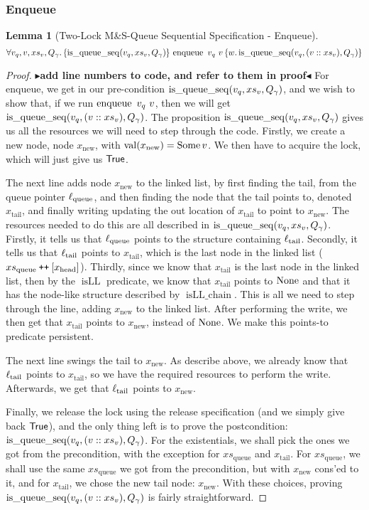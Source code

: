 \documentclass[a4paper, 10pt]{report}
\theoremstyle{definition}
\newtheorem{lemma}[theorem]{Lemma}
\newcommand{\enqueue}{\operatorname{enqueue}}
\newcommand{\msq}{M\&S-Queue\xspace}
\newcommand{\tlmsq}{Two-Lock \msq}
\newcommand{\isqueueseq}{\operatorname{is\_queue\_seq}}
\newcommand{\vq}{v_q}
\newcommand{\xsqueue}{xs_{\mathrm{queue}}}
\newcommand{\isLLchain}{\operatorname{isLL\_chain}}
\newcommand{\isLL}{\operatorname{isLL}}
\newcommand{\locN}[1]{\loc_{\mathrm{#1}}}
\newcommand{\loctail}{\locN{tail}}
\newcommand{\locqueue}{\locN{queue}}
\newcommand{\nVal}[1]{\operatorname{val}(#1)}
\newcommand{\node}{x}
\newcommand{\nodeN}[1]{\node_{\mathrm{#1}}}
\newcommand{\nodehead}{\nodeN{head}}
\newcommand{\nodetail}{\nodeN{tail}}
\newcommand{\nodenew}{\nodeN{new}}
\newcommand{\absvalue}{\val}
\newcommand{\absvalueList}{xs_v}
\newcommand{\Qg}{Q_\gname}
\newcommand\catenate{\mathbin{\text{\ttfamily\upshape ++}}}
\newcommand{\tlseqspecenq}{\All \vq, \absvalue, \absvalueList, \Qg. \hoare{\isqueueseq(\vq, \absvalueList, \Qg)}{\enqueue \ \vq \ \absvalue}{\valB . \isqueueseq(\vq, (\absvalue :: \absvalueList), \Qg)}}
\newcommand{\todo}[1]{{\color[rgb]{.5,0,0}\textbf{$\blacktriangleright$#1$\blacktriangleleft$}}}
\begin{document}
\subsubsection{Enqueue}
\begin{lemma}[\tlmsq Sequential Specification - Enqueue]\label{TLMSQ:spec:seq:enqueue}
  \begin{equation*}
    \tlseqspecenq
  \end{equation*}
\end{lemma}
\begin{proof}
\todo{add line numbers to code, and refer to them in proof}
For enqueue, we get in our pre-condition $\isqueueseq(\vq, \absvalueList, \Qg)$, and we wish to show that, if we run $\enqueue \ \vq \ \absvalue$, then we will get $\isqueueseq(\vq, (\absvalue :: \absvalueList), \Qg)$. The proposition $\isqueueseq(\vq, \absvalueList, \Qg)$ gives us all the resources we will need to step through the code.
Firstly, we create a new node, node $\nodenew$, with $\nVal{\nodenew} = \Some \absvalue$.
We then have to acquire the lock, which will just give us $\textsf{True}$.

The next line adds node $\nodenew$ to the linked list, by first finding the tail, from the queue pointer $\locqueue$, and then finding the node that the tail points to, denoted $\nodetail$, and finally writing updating the out location of $\nodetail$ to point to $\nodenew$. The resources needed to do this are all described in $\isqueueseq(\vq, \absvalueList, \Qg)$. Firstly, it tells us that $\locqueue$ points to the structure containing $\loctail$. Secondly, it tells us that $\loctail$ points to $\nodetail$, which is the last node in the linked list ($\xsqueue \catenate [\nodehead]$). Thirdly, since we know that $\nodetail$ is the last node in the linked list, then by the $\isLL$ predicate, we know that $\nodetail$ points to $\operatorname{None}$ and that it has the node-like structure described by $\isLLchain$. This is all we need to step through the line, adding $\nodenew$ to the linked list. After performing the write, we then get that $\nodetail$ points to $\nodenew$, instead of $\operatorname{None}$. We make this points-to predicate persistent.

The next line swings the tail to $\nodenew$. As describe above, we already know that $\loctail$ points to $\nodetail$, so we have the required resources to perform the write. Afterwards, we get that $\loctail$ points to $\nodenew$.

Finally, we release the lock using the release specification (and we simply give back $\textsf{True}$), and the only thing left is to prove the postcondition: $\isqueueseq(\vq, (\absvalue :: \absvalueList), \Qg)$. For the existentials, we shall pick the ones we got from the precondition, with the exception for $\xsqueue$ and $\nodetail$. For $\xsqueue$, we shall use the same $\xsqueue$ we got from the precondition, but with $\nodenew$ cons'ed to it, and for $\nodetail$, we chose the new tail node: $\nodenew$. With these choices, proving $\isqueueseq(\vq, (\absvalue :: \absvalueList), \Qg)$ is fairly straightforward.
\end{proof}
\end{document}
